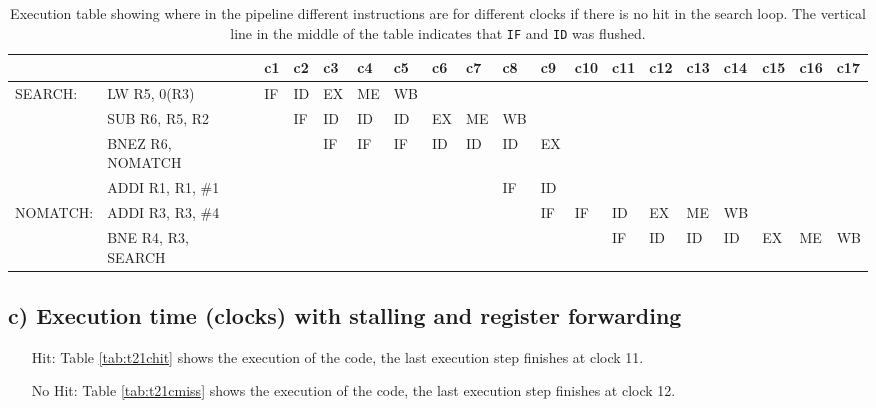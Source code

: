 \begin{landscape}
    \begin{table}[]
    \centering
    \begin{tabular}{lllllllllllllllllll}
    \hline
             &                                         & c1 & c2 & c3 & c4 & c5 & c6 & c7 & c8 & c9                      & c10 & c11 & c12 & c13 & c14 & c15 & c16 & c17 \\ \hline
    SEARCH:  & \multicolumn{1}{l|}{LW R5, 0(R3)}       & IF & ID & EX & ME & WB &    &    &    &                         &     &     &     &     &     &     &     &    \\
             & \multicolumn{1}{l|}{SUB R6, R5, R2}     &    & IF & ID & ID & ID & EX & ME & WB &                         &     &     &     &     &     &     &     &     \\
             & \multicolumn{1}{l|}{BNEZ R6, NOMATCH}   &    &    & IF & IF & IF & ID & ID & ID & \multicolumn{1}{l|}{EX} &     &     &     &     &     &     &     &     \\
             & \multicolumn{1}{l|}{ADDI R1, R1, \#1}   &    &    &    &    &    &    &    & IF & \multicolumn{1}{l|}{ID} &     &     &     &     &     &     &     &     \\
    NOMATCH: & \multicolumn{1}{l|}{ADDI R3, R3, \#4}   &    &    &    &    &    &    &    &    & \multicolumn{1}{l|}{IF} & IF  & ID  & EX  & ME  & WB  &     &     &     \\
             & \multicolumn{1}{l|}{BNE R4, R3, SEARCH} &    &    &    &    &    &    &    &    &                         &     & IF  & ID  & ID  & ID  & EX  & ME  & WB  \\ \hline
    \end{tabular}
    \caption{Execution table showing where in the pipeline different instructions are for different clocks if there is no hit in the search loop. The vertical line in the middle of the table indicates that \texttt{IF} and \texttt{ID} was flushed.}
    \label{tab:t21bmiss}
    \end{table}
\end{landscape}


\subsection{c) Execution time (clocks) with stalling and register forwarding}
\begin{itemize}
    \item[Hit: ] Table \ref{tab:t21chit} shows  the execution of the code, the
    last execution step finishes at clock 11.

    \item[No Hit: ] Table \ref{tab:t21cmiss} shows  the execution of the code, the
    last execution step finishes at clock 12.
\end{itemize}

